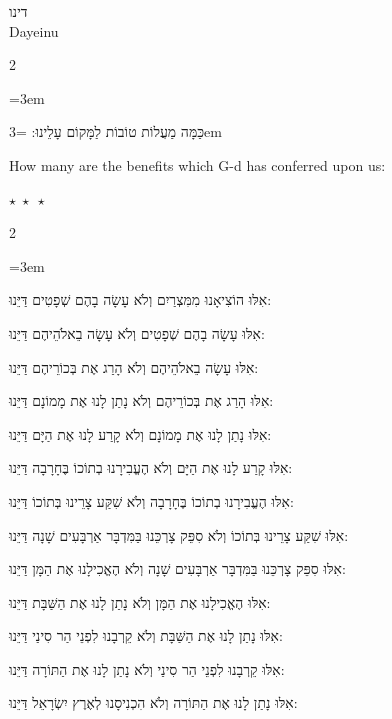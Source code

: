 \documentclass[11pt, openany]{book}
\newenvironment{bilingual}{%
  \par\vspace{4pt}%
  \begin{paracol}{2}%
}{%
  \end{paracol}%
  \par\vspace{2pt}%
}
\newenvironment{hebrewcol}{%
  \switchcolumn[1]%
  \begingroup
  \RTL
  \hebrewfont\large
  \setstretch{1.4}%
  \emergencystretch=3em
  \tolerance=9999
  \parindent=0pt\relax
}{%
  \endRTL
  \endgroup
}
\newenvironment{englishcol}{%
  \switchcolumn[0]%
  \begingroup
  \setstretch{1.4}%
  \emergencystretch=3em
  \tolerance=9999
  \normalsize
  \rightskip=0.12in\relax
}{%
  \endgroup
}
\newcommand{\parasep}{%
  \par\vspace{3pt}
  \begin{center}
    \textcolor{sedergold!50}{\small$\star\;\star\;\star$}
  \end{center}
  \par\vspace{3pt}
}
\newcommand{\subsedertitle}[2]{%
  \par\vspace{8pt}
  \begin{center}
    {\kidssteptitlefonthebrew\textcolor{sederblue}{\beginR #1\endR}}\\[3pt]
    {\kidssteptitlefont\normalsize\textcolor{sederblue}{#2}}
  \end{center}
  \par\vspace{3pt}
}
\begin{document}
\subsedertitle{דינו}{Dayeinu}


\begin{bilingual}
\begin{hebrewcol}
כַּמָּה מַעֲלוֹת טוֹבוֹת לַמָּקוֹם עָלֵינוּ:
\end{hebrewcol}
\begin{englishcol}
How many are the benefits which G-d has conferred upon us:
\end{englishcol}
\end{bilingual}
\parasep

\begin{bilingual}
\begin{hebrewcol}
אִלּוּ הוֹצִיאָנוּ מִמִּצְרַיִם וְלֹא עָשָׂה בָהֶם שְׁפָטִים דַּיֵּנוּ:

אִלּוּ עָשָׂה בָהֶם שְׁפָטִים וְלֹא עָשָׂה בֵאלֹהֵיהֶם דַּיֵּנוּ:

אִלּוּ עָשָׂה בֵאלֹהֵיהֶם וְלֹא הָרַג אֶת בְּכוֹרֵיהֶם דַּיֵּנוּ:

אִלּוּ הָרַג אֶת בְּכוֹרֵיהֶם וְלֹא נָתַן לָנוּ אֶת מָמוֹנָם דַּיֵּנוּ:

אִלּוּ נָתַן לָנוּ אֶת מָמוֹנָם וְלֹא קָרַע לָנוּ אֶת הַיָּם דַּיֵּנוּ:

אִלּוּ קָרַע לָנוּ אֶת הַיָּם וְלֹא הֶעֱבִירָנוּ בְתוֹכוֹ בֶּחָרָבָה דַּיֵּנוּ:

אִלּוּ הֶעֱבִירָנוּ בְתוֹכוֹ בֶּחָרָבָה וְלֹא שִׁקַּע צָרֵינוּ בְּתוֹכוֹ דַּיֵּנוּ:

אִלּוּ שִׁקַּע צָרֵינוּ בְּתוֹכוֹ וְלֹא סִפֵּק צָרְכֵּנוּ בַּמִּדְבָּר אַרְבָּעִים שָׁנָה			 דַּיֵּנוּ:

אִלּוּ סִפֵּק צָרְכֵּנוּ בַּמִּדְבָּר אַרְבָּעִים שָׁנָה וְלֹא הֶאֱכִילָנוּ אֶת הַמָּן			 דַּיֵּנוּ:

אִלּוּ הֶאֱכִילָנוּ אֶת הַמָּן וְלֹא נָתַן לָנוּ אֶת הַשַּׁבָּת דַּיֵּנוּ:

אִלּוּ נָתַן לָנוּ אֶת הַשַּׁבָּת וְלֹא קֵרְבָנוּ לִפְנֵי הַר סִינַי דַּיֵּנוּ:

אִלּוּ קֵרְבָנוּ לִפְנֵי הַר סִינַי וְלֹא נָתַן לָנוּ אֶת הַתּוֹרָה דַּיֵּנוּ:

אִלּוּ נָתַן לָנוּ אֶת הַתּוֹרָה וְלֹא הִכְנִיסָנוּ לְאֶרֶץ יִשְׂרָאֵל דַּיֵּנוּ:


\end{hebrewcol}
\end{bilingual}
\end{document}
